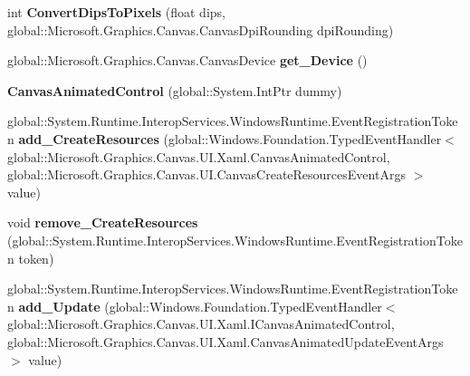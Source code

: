 \begin{DoxyCompactItemize}
int {\bfseries Convert\+Dips\+To\+Pixels} (float dips, global\+::\+Microsoft.\+Graphics.\+Canvas.\+Canvas\+Dpi\+Rounding dpi\+Rounding)
\item 
\mbox{\label{class_microsoft_1_1_graphics_1_1_canvas_1_1_u_i_1_1_xaml_1_1_canvas_animated_control_aec535e07f21ffa8f46615d610ebefa92}} 
global\+::\+Microsoft.\+Graphics.\+Canvas.\+Canvas\+Device {\bfseries get\+\_\+\+Device} ()
\item 
\mbox{\label{class_microsoft_1_1_graphics_1_1_canvas_1_1_u_i_1_1_xaml_1_1_canvas_animated_control_a8981d0bd18a97c22dbdf7422dc124959}} 
{\bfseries Canvas\+Animated\+Control} (global\+::\+System.\+Int\+Ptr dummy)
\item 
\mbox{\label{class_microsoft_1_1_graphics_1_1_canvas_1_1_u_i_1_1_xaml_1_1_canvas_animated_control_a625047d0ad176bc76c1686e025f4ee53}} 
global\+::\+System.\+Runtime.\+Interop\+Services.\+Windows\+Runtime.\+Event\+Registration\+Token {\bfseries add\+\_\+\+Create\+Resources} (global\+::\+Windows.\+Foundation.\+Typed\+Event\+Handler$<$ global\+::\+Microsoft.\+Graphics.\+Canvas.\+U\+I.\+Xaml.\+Canvas\+Animated\+Control, global\+::\+Microsoft.\+Graphics.\+Canvas.\+U\+I.\+Canvas\+Create\+Resources\+Event\+Args $>$ value)
\item 
\mbox{\label{class_microsoft_1_1_graphics_1_1_canvas_1_1_u_i_1_1_xaml_1_1_canvas_animated_control_a44a43d134b2c41ea2ec6eddf26aadd31}} 
void {\bfseries remove\+\_\+\+Create\+Resources} (global\+::\+System.\+Runtime.\+Interop\+Services.\+Windows\+Runtime.\+Event\+Registration\+Token token)
\item 
\mbox{\label{class_microsoft_1_1_graphics_1_1_canvas_1_1_u_i_1_1_xaml_1_1_canvas_animated_control_aa7a0e408eb82cfc307935e5bb671c4b8}} 
global\+::\+System.\+Runtime.\+Interop\+Services.\+Windows\+Runtime.\+Event\+Registration\+Token {\bfseries add\+\_\+\+Update} (global\+::\+Windows.\+Foundation.\+Typed\+Event\+Handler$<$ global\+::\+Microsoft.\+Graphics.\+Canvas.\+U\+I.\+Xaml.\+I\+Canvas\+Animated\+Control, global\+::\+Microsoft.\+Graphics.\+Canvas.\+U\+I.\+Xaml.\+Canvas\+Animated\+Update\+Event\+Args $>$ value)

\end{DoxyCompactItemize}

